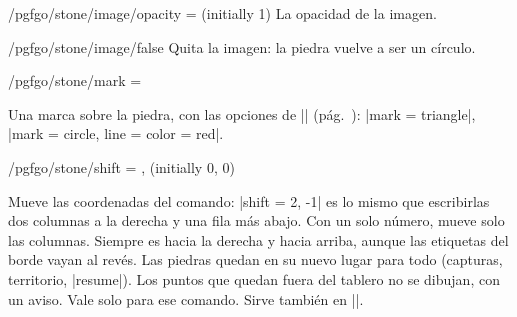 \begin{key}{/pgfgo/stone/image/opacity =  (initially 1)}
	La opacidad de la imagen.

	\begin{codeexample}[]
		\begin{goban}[5, partial = B2:D4]
		\end{goban}
	\end{codeexample}
\end{key}

\begin{stylekey}{/pgfgo/stone/image/false}
	Quita la imagen: la piedra vuelve a ser un círculo.
\end{stylekey}

\begin{key}{/pgfgo/stone/mark = }
	
	Una marca sobre la piedra, con las opciones de |\mark| (pág.~\pageref{sec:marcas}): |mark = triangle|, |mark = {circle, line = {color = red}}|.
	
	\begin{codeexample}[]
		
		\begin{goban}
		\end{goban}
		
		\begin{goban}
			\stones[b, mark = triangle]{C2,D3}
			\stone[w, mark = t-circle]{B4}
		\end{goban}
	\end{codeexample}
\end{key}

\begin{key}{/pgfgo/stone/shift = ,  (initially 0, 0)}

	Mueve las coordenadas del comando: |shift = {2, -1}| es lo mismo que escribirlas dos columnas a la derecha y una fila más abajo. Con un solo número, mueve solo las columnas. Siempre es hacia la derecha y hacia arriba, aunque las etiquetas del borde vayan al revés. Las piedras quedan en su nuevo lugar para todo (capturas, territorio, |resume|). Los puntos que quedan fuera del tablero no se dibujan, con un aviso. Vale solo para ese comando. Sirve también en |\stone|.

	\begin{codeexample}[]
		\def\esquina{A1--A3, B5; A2}
		\begin{goban}[9]
			\stones[b]{\esquina}
			\stones[w, shift = {4, 2}]{\esquina}
		\end{goban}
	\end{codeexample}
\end{key}

